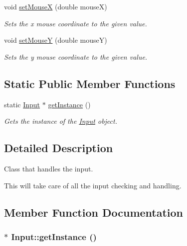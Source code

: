 \begin{CompactItemize}
void \hyperlink{class_input_9abdbbeb53817c1b4ba8d8e1b0dde987}{setMouseX} (double mouseX)
\begin{CompactList}\small\item\em Sets the x mouse coordinate to the given value. \item\end{CompactList}\item 
void \hyperlink{class_input_bc0540b1ca3477ff0418e596e0dd58d0}{setMouseY} (double mouseY)
\begin{CompactList}\small\item\em Sets the y mouse coordinate to the given value. \item\end{CompactList}\end{CompactItemize}
\subsection*{Static Public Member Functions}
\begin{CompactItemize}
\item 
static \hyperlink{class_input}{Input} $\ast$ \hyperlink{class_input_10aa6d0ec967a2c9f424ebe3aa4afdb2}{getInstance} ()
\begin{CompactList}\small\item\em Gets the instance of the \hyperlink{class_input}{Input} object. \item\end{CompactList}\end{CompactItemize}


\subsection{Detailed Description}
Class that handles the input. 

This will take care of all the input checking and handling. 

\subsection{Member Function Documentation}
\hypertarget{class_input_10aa6d0ec967a2c9f424ebe3aa4afdb2}{
\subsubsection[{getInstance}]{ $\ast$ Input::getInstance ()}}
\label{class_input_10aa6d0ec967a2c9f424ebe3aa4afdb2}


